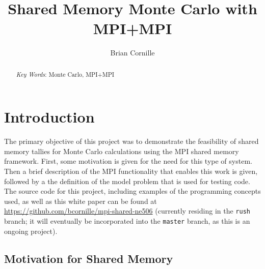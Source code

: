 \documentclass{mc2015}
\begin{document}
\title{Shared Memory Monte Carlo with MPI+MPI}

\author{Brian Cornille}


\maketitle

\begin{abstract}



\emph{Key Words}: Monte Carlo, MPI+MPI
\end{abstract}

\section{Introduction}

The primary objective of this project was to demonstrate the feasibility of
shared memory tallies for Monte Carlo calculations using the MPI shared memory framework.
First, some motivation is given for the need for this type of system.
Then a brief description of the MPI functionality that enables this work is given,
followed by a the definition of the model problem that is used for testing code.
The source code for this project, including examples of the programming concepts used,
as well as this white paper can be found at
\url{https://github.com/bcornille/mpi-shared-ne506}
(currently residing in the \lstinline$rush$ branch;
it will eventually be incorporated into the \lstinline$master$ branch,
as this is an ongoing project).


\subsection{Motivation for Shared Memory}
\end{document}
